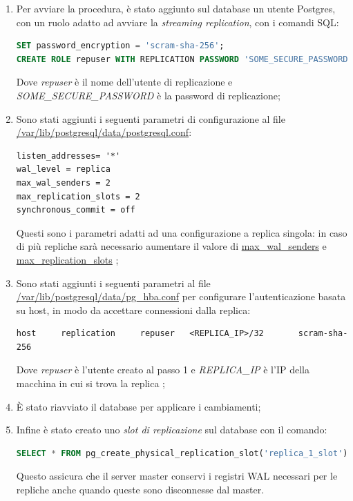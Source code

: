 \begin{enumerate}
  \item Per avviare la procedura, è stato aggiunto sul database un utente Postgres, con un ruolo adatto ad avviare la \textit{streaming replication}, con i comandi SQL:
  \vspace{1mm}
   \begin{lstlisting}[language=sql]
SET password_encryption = 'scram-sha-256'; 
CREATE ROLE repuser WITH REPLICATION PASSWORD 'SOME_SECURE_PASSWORD' LOGIN;\end{lstlisting}
Dove \textit{repuser} è il nome dell'utente di replicazione e\\ \textit{SOME\_SECURE\_PASSWORD} è la password di replicazione;
  \item Sono stati aggiunti i seguenti parametri di configurazione al file \url{/var/lib/postgresql/data/postgresql.conf}:
  \vspace{1mm}
  \begin{lstlisting}[]
listen_addresses= '*'
wal_level = replica
max_wal_senders = 2
max_replication_slots = 2
synchronous_commit = off
\end{lstlisting}
Questi sono i parametri adatti ad una configurazione a replica singola: in caso di più repliche sarà necessario aumentare il valore di \url{max_wal_senders} e \url{max_replication_slots} \cite{stre_re};

  \item Sono stati aggiunti i seguenti parametri al file \url{/var/lib/postgresql/data/pg_hba.conf} per configurare l'autenticazione basata su host, in modo da accettare connessioni dalla replica:
  \vspace{1mm}
\begin{lstlisting}[]
host     replication     repuser   <REPLICA_IP>/32       scram-sha-256
\end{lstlisting}
Dove \textit{repuser} è l'utente creato al passo 1 e \textit{REPLICA\_IP} è l'IP della macchina in cui si trova la replica \cite{stre_re};
  \item È stato riavviato il database per applicare i cambiamenti;
  \item Infine è stato creato uno \textit{slot di replicazione} sul database con il comando:
  \vspace{1mm}
  \begin{lstlisting}[language=sql]
SELECT * FROM pg_create_physical_replication_slot('replica_1_slot');
\end{lstlisting}
Questo assicura che il server master conservi i registri WAL necessari per le repliche anche quando queste sono disconnesse dal master.
\end{enumerate}

